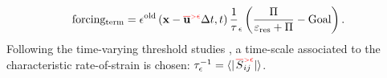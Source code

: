\begin{description}
{\begin{equation}
                   \label{eq:FT2_1} \vspace*{3pt}
                   {\rm  forcing_{term} } =
                   \epsilon^{\rm old} \left( {\mathbf x}-\bareps[{\mathbf u}] \Delta t,t\right)
                   \frac 1 \tau_{\epsilon}
                   \left( \frac{\Pi }  {  \varepsilon_{\rm res}  +  \Pi }  -  {\rm Goal} \right).
               \end{equation}
%
               Following the time-varying threshold studies \cite{POF_2010},
               a time-scale associated to the characteristic rate-of-strain is chosen:
               $\tau_{\epsilon}^{-1} = \langle {|
               {{\left.\red\overline{\bl S}_{\bl ij} \rule{-8pt}{6pt}\right.}^{\red {\scriptscriptstyle >} \epsilon}}
               |} \rangle$.

}
\end{description}


%






